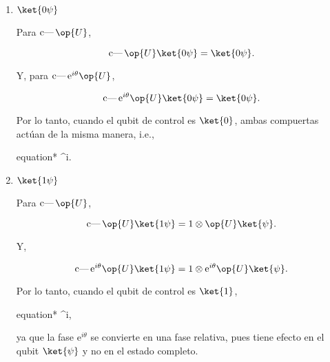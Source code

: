 \documentclass[./../main.tex]{subfiles}
\begin{document}
\begin{enumerate}
	      \begin{enumerate}
		      \item \(\ket{0\psi}\)

		            Para \(\cnot\op{U}\),

		            \begin{equation*}
			            \cnot\op{U}\ket{0\psi} = \ket{0\psi}.
		            \end{equation*}

		            Y, para \(\cnot\mathrm{e}^{i\theta}\op{U}\),

		            \begin{equation*}
			            \cnot\mathrm{e}^{i\theta}\op{U}\ket{0\psi} = \ket{0\psi}.
		            \end{equation*}

		            Por lo tanto, cuando el qubit de control es \(\ket{0}\), ambas compuertas actúan de la misma manera, i.e.,

		            \begin{empheq}[box=\mainresult]{equation*}
			            \cnot{} \equiv \cnot{}^{i\theta}.
		            \end{empheq}

		      \item \(\ket{1\psi}\)

		            Para \(\cnot\op{U}\),

		            \begin{equation*}
			            \cnot\op{U}\ket{1\psi} = \tensprod{1}{\op{U}\ket{\psi}}.
		            \end{equation*}

		            Y,

		            \begin{equation*}
			            \cnot\mathrm{e}^{i\theta}\op{U}\ket{1\psi} = \tensprod{1}{\mathrm{e}^{i\theta}\op{U}\ket{\psi}}.
		            \end{equation*}

		            Por lo tanto, cuando el qubit de control es \(\ket{1}\),

		            \begin{empheq}[box=\mainresult]{equation*}
			            \cnot{} \not\equiv \cnot{}^{i\theta},
		            \end{empheq}

		            ya que la fase \(\mathrm{e}^{i\theta}\) se convierte en una fase relativa, pues tiene efecto en el qubit \(\ket{\psi}\) y no en el estado completo.
	      \end{enumerate}
\end{enumerate}
\end{document}
